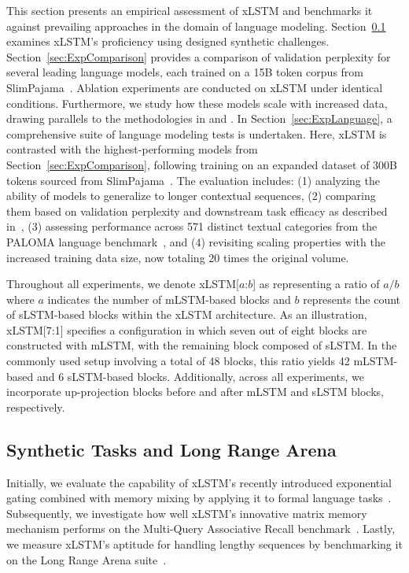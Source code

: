 This section presents an empirical assessment of xLSTM and benchmarks it against prevailing approaches in the domain of language modeling. Section~\ref{sec:ExpSyntethic} examines xLSTM's proficiency using designed synthetic challenges. 
Section~\ref{sec:ExpComparison} provides a comparison of validation perplexity for several leading language models, each trained on a 15B token corpus from SlimPajama~\citep{Soboleva:23}. Ablation experiments are conducted on xLSTM under identical conditions. Furthermore, we study how these models scale with increased data, drawing parallels to the methodologies in \citet{Kaplan:20} and \citet{Brown:20short}.
In Section~\ref{sec:ExpLanguage}, 
a comprehensive suite of language modeling tests is undertaken. Here, xLSTM is contrasted with the highest-performing models from Section~\ref{sec:ExpComparison}, following training on an expanded dataset of 300B tokens sourced from SlimPajama~\citep{Soboleva:23}. The evaluation includes: (1) analyzing the ability of models to generalize to longer contextual sequences, (2) comparing them based on validation perplexity and downstream task efficacy as described in~\citep{Sutawika:24}, (3) assessing performance across 571 distinct textual categories from the PALOMA language benchmark~\citep{Magnusson:23arxivshort}, and (4) revisiting scaling properties with the increased training data size, now totaling 20 times the original volume.

\label{sec:xlstm_blocks_notation}
Throughout all experiments, we denote xLSTM[$a$:$b$] as representing a ratio of $a/b$ where $a$ indicates the number of mLSTM-based blocks and $b$ represents the count of sLSTM-based blocks within the xLSTM architecture. As an illustration, xLSTM[7:1] specifies a configuration in which seven out of eight blocks are constructed with mLSTM, with the remaining block composed of sLSTM. In the commonly used setup involving a total of 48 blocks, this ratio yields 42 mLSTM-based and 6 sLSTM-based blocks. Additionally, across all experiments, we incorporate up-projection blocks before and after mLSTM and sLSTM blocks, respectively.

\subsection{Synthetic Tasks and Long Range Arena}
\label{sec:ExpSyntethic}
Initially, we evaluate the capability of xLSTM's recently introduced exponential gating combined with memory mixing by applying it to formal language tasks~\citep{Deletang:23}. Subsequently, we investigate how well xLSTM's innovative matrix memory mechanism performs on the Multi-Query Associative Recall benchmark~\citep{Arora:23arxiv}. Lastly, we measure xLSTM's aptitude for handling lengthy sequences by benchmarking it on the Long Range Arena suite~\citep{Tay:21}.

